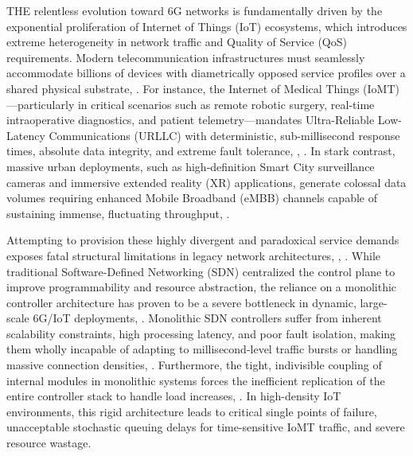 \textsc{T}\textsc{HE} relentless evolution toward 6G networks is fundamentally driven by the exponential proliferation of Internet of Things (IoT) ecosystems, which introduces extreme heterogeneity in network traffic and Quality of Service (QoS) requirements\cite{b1}. Modern telecommunication infrastructures must seamlessly accommodate billions of devices with diametrically opposed service profiles over a shared physical substrate\cite{b2}, \cite{b3}. For instance, the Internet of Medical Things (IoMT)---particularly in critical scenarios such as remote robotic surgery, real-time intraoperative diagnostics, and patient telemetry---mandates Ultra-Reliable Low-Latency Communications (URLLC) with deterministic, sub-millisecond response times, absolute data integrity, and extreme fault tolerance\cite{b1}, \cite{b4}, \cite{b5}. In stark contrast, massive urban deployments, such as high-definition Smart City surveillance cameras and immersive extended reality (XR) applications, generate colossal data volumes requiring enhanced Mobile Broadband (eMBB) channels capable of sustaining immense, fluctuating throughput\cite{b4}, \cite{b6}.

Attempting to provision these highly divergent and paradoxical service demands exposes fatal structural limitations in legacy network architectures\cite{b1}, \cite{b7}, \cite{b8}. While traditional Software-Defined Networking (SDN) centralized the control plane to improve programmability and resource abstraction, the reliance on a monolithic controller architecture has proven to be a severe bottleneck in dynamic, large-scale 6G/IoT deployments\cite{b8}, \cite{b9}. Monolithic SDN controllers suffer from inherent scalability constraints, high processing latency, and poor fault isolation, making them wholly incapable of adapting to millisecond-level traffic bursts or handling massive connection densities\cite{b8}, \cite{b9}. Furthermore, the tight, indivisible coupling of internal modules in monolithic systems forces the inefficient replication of the entire controller stack to handle load increases\cite{b8}, \cite{b9}. In high-density IoT environments, this rigid architecture leads to critical single points of failure, unacceptable stochastic queuing delays for time-sensitive IoMT traffic, and severe resource wastage\cite{b9}.

